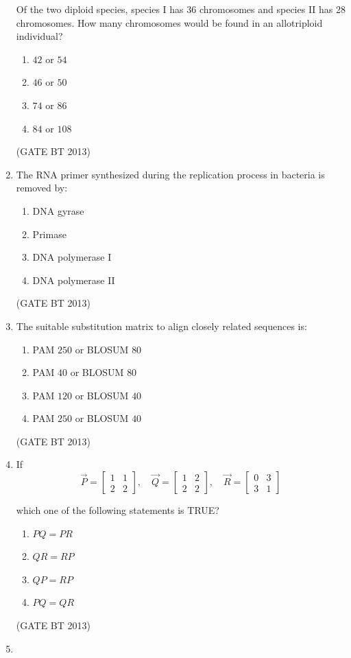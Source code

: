 \documentclass[journal,12pt,onecolumn]{IEEEtran}
\theoremstyle{remark}
\begin{document}
\begin{enumerate}
Of the two diploid species, species I has 36 chromosomes and species II has 28 chromosomes. How many chromosomes would be found in an allotriploid individual?

\begin{enumerate}
    \item $42$ or $54$
    \item $46$ or $50$
    \item $74$ or $86$
    \item $84$ or $108$
\end{enumerate} 
\hfill (GATE BT 2013)
\item 

The RNA primer synthesized during the replication process in bacteria is removed by:

\begin{enumerate}
    \item DNA gyrase
    \item Primase
    \item DNA polymerase I
    \item DNA polymerase II
\end{enumerate} 
\hfill (GATE BT 2013)
\item 

The suitable substitution matrix to align closely related sequences is:

\begin{enumerate}
    \item PAM $250$ or BLOSUM $80$
    \item PAM $40$ or BLOSUM $80$
    \item PAM $120$ or BLOSUM $40$
    \item PAM $250$ or BLOSUM $40$
\end{enumerate} 
\hfill (GATE BT 2013)
\item 

If 
\[
\vec{P} = \begin{bmatrix}
1 & 1 \\
2 & 2
\end{bmatrix},
\quad
\vec{Q} = \begin{bmatrix}
1 & 2 \\
2 & 2
\end{bmatrix},
\quad
\vec{R} = \begin{bmatrix}
0 & 3 \\
3 & 1
\end{bmatrix}
\]

which one of the following statements is TRUE?

\begin{enumerate}
    \item $PQ = PR$
    \item $QR = RP$
    \item $QP = RP$
    \item $PQ = QR$
\end{enumerate}
\hfill (GATE BT 2013)
\item 


\end{enumerate}
\end{document}
